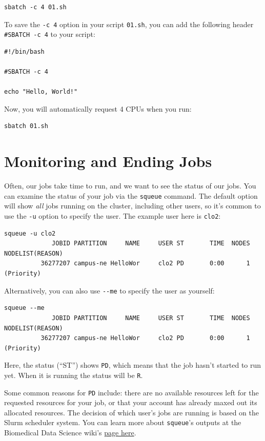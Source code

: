 \documentclass[
]{book}
\begin{document}
\begin{verbatim}
sbatch -c 4 01.sh
\end{verbatim}

To save the \texttt{-c\ 4} option in your script \texttt{01.sh}, you can add the following header \texttt{\#SBATCH\ -c\ 4} to your script:

\begin{verbatim}
#!/bin/bash

#SBATCH -c 4

echo "Hello, World!"
\end{verbatim}

Now, you will automatically request 4 CPUs when you run:

\begin{verbatim}
sbatch 01.sh
\end{verbatim}

\hypertarget{monitoring-and-ending-jobs}{%
\section{Monitoring and Ending Jobs}\label{monitoring-and-ending-jobs}}

Often, our jobs take time to run, and we want to see the status of our jobs. You can examine the status of your job via the \texttt{squeue} command. The default option will show \emph{all} jobs running on the cluster, including other users, so it's common to use the \texttt{-u} option to specify the user. The example user here is \texttt{clo2}:

\begin{verbatim}
squeue -u clo2
             JOBID PARTITION     NAME     USER ST       TIME  NODES NODELIST(REASON)
          36277207 campus-ne HelloWor     clo2 PD       0:00      1 (Priority)
\end{verbatim}

Alternatively, you can also use \texttt{-\/-me} to specify the user as yourself:

\begin{verbatim}
squeue --me
             JOBID PARTITION     NAME     USER ST       TIME  NODES NODELIST(REASON)
          36277207 campus-ne HelloWor     clo2 PD       0:00      1 (Priority)
\end{verbatim}

Here, the status (``ST'') shows \texttt{PD}, which means that the job hasn't started to run yet. When it is running the status will be \texttt{R}.

Some common reasons for \texttt{PD} include: there are no available resources left for the requested resources for your job, or that your account has already maxed out its allocated resources. The decision of which user's jobs are running is based on the Slurm scheduler system. You can learn more about \texttt{squeue}'s outputs at the Biomedical Data Science wiki's \href{https://sciwiki.fredhutch.org/scicomputing/compute_jobs/\#why-isnt-my-job-running}{page here}.
\end{document}

